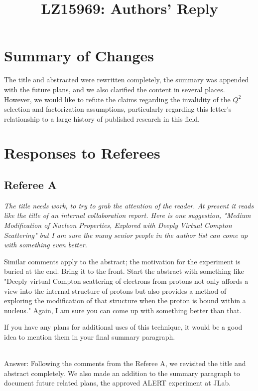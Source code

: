 \documentclass{article}
\title{LZ15969:  Authors' Reply}
\begin{document}
\maketitle

\section{Summary of Changes}

The title and abstracted were rewritten completely, the summary was appended with the future plans, and we also clarified the content in several places. However, we would like to refute the claims regarding the invalidity of the $Q^2$ selection and factorization assumptions, particularly regarding this letter's relationship to a large history of published research in this field.

\section{Responses to Referees}

\subsection{Referee A}

{\em The title needs work, to try to grab the attention of the reader.
At present it reads like the title of an internal collaboration
report. Here is one suggestion, "Medium Modification of Nucleon 
Properties, Explored with Deeply Virtual Compton Scattering" but 
I am sure the many senior people in the author list can come up
with something even better.

Similar comments apply to the abstract; the motivation for the
experiment is buried at the end. Bring it to the front. Start the
abstract with something like "Deeply virtual Compton scattering of
electrons from protons not only affords a view into the internal
structure of protons but also provides a method of exploring the
modification of that structure when the proton is bound within a
nucleus." Again, I am sure you can come up with something better than
that.

If you have any plans for additional uses of this technique, it
would be a good idea to mention them in your final summary paragraph.}

\noindent \\
Answer: Following the comments from the Referee A, we revisited the title and abstract completely. We
also made an addition to the summary paragraph to document future related plans, the approved ALERT experiment at JLab.
\end{document}
